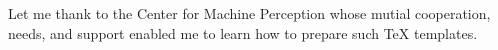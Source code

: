\startAcknowledgement
Let me thank to the Center for Machine Perception whose mutial cooperation, needs,
and support enabled me to learn how to prepare such \TeX{} templates.
\stopAcknowledgement

\endinput
